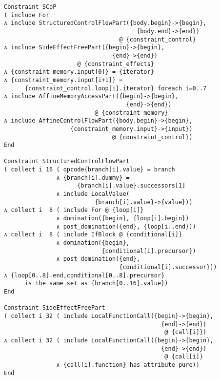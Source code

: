 \begin{lstlisting}[language=CAnDL,basicstyle=\linespread{0.85}\small\ttfamily,
                   captionpos=t,caption=
   {Constraint specification in CAnDL of Scalar Control Parts (SCoPs):
    These regular loop nests enable polyhedral transformations to be applied,
    due to their structured control flow, side effect free function calls and
    the well-behaved memory access that is affine in loop iterators.
    The involved CAnDL code is displayed, including relevant parts of the CAnDL
    standard library.
    \parfillskip=0pt}]
Constraint SCoP
( include For
∧ include StructuredControlFlowPart({body.begin}->{begin},
                                      {body.end}->{end})
                                 @ {constraint_control}
∧ include SideEffectFreePart({begin}->{begin},
                               {end}->{end})
                     @ {constraint_effects}
∧ {constraint_memory.input[0]} = {iterator}
∧ {constraint_memory.input[i+1]} =
      {constraint_control.loop[i].iterator} foreach i=0..7
∧ include AffineMemoryAccessPart({begin}->{begin},
                                   {end}->{end})
                          @ {constraint_memory}
∧ include AffineControlFlowPart({body.begin}->{begin},
                   {constraint_memory.input}->{input})
                               @ {constraint_control})
End

Constraint StructuredControlFlowPart
( collect i 16 ( opcode{branch[i].value} = branch
               ∧ {branch[i].dummy} =
                     {branch[i].value}.successors[1]
               ∧ include LocalValue(
                          {branch[i].value}->{value}))
∧ collect i  8 ( include For @ {loop[i]}
               ∧ domination({begin}, {loop[i].begin})
               ∧ post_domination({end}, {loop[i].end}))
∧ collect i  8 ( include IfBlock @ {conditional[i]}
               ∧ domination({begin},
                            {conditional[i].precursor})
               ∧ post_domination({end},
                                 {conditional[i].successor}))
∧ {loop[0..8].end,conditional[0..8].precursor}
      is the same set as {branch[0..16].value})
End

Constraint SideEffectFreePart
( collect i 32 ( include LocalFunctionCall({begin}->{begin},
                                             {end}->{end})
                                              @ {call[i]}) 
∧ collect i 32 ( include LocalFunctionCall({begin}->{begin},
                                             {end}->{end})
                                              @ {call[i]}
               ∧ {call[i].function} has attribute pure))
End


\end{lstlisting}
